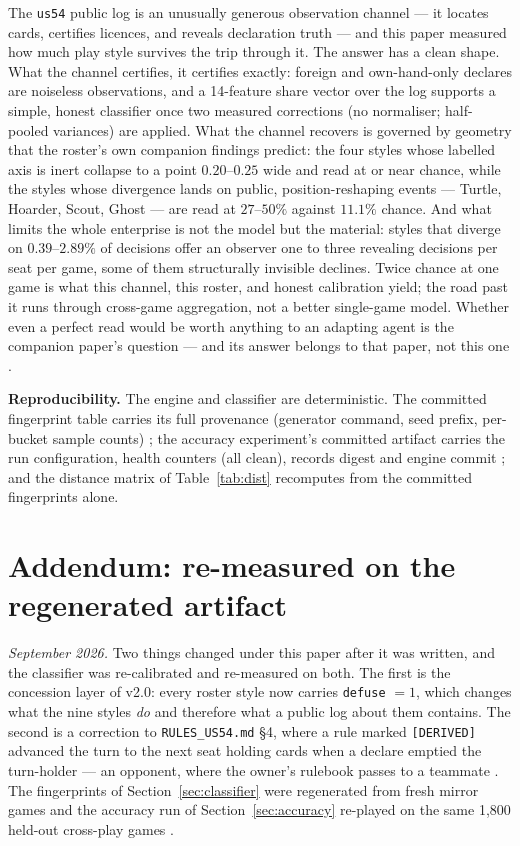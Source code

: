 \documentclass[11pt]{article}
\newcommand{\code}[1]{\texttt{#1}}
\newcommand{\usff}{\code{us54}}
\begin{document}
The \usff{} public log is an unusually generous observation channel --- it locates cards,
certifies licences, and reveals declaration truth --- and this paper measured how much play
style survives the trip through it. The answer has a clean shape. What the channel certifies,
it certifies exactly: foreign and own-hand-only declares are noiseless observations, and a
14-feature share vector over the log supports a simple, honest classifier once two measured
corrections (no normaliser; half-pooled variances) are applied. What the channel recovers is
governed by geometry that the roster's own companion findings predict: the four styles whose
labelled axis is inert collapse to a point $0.20$--$0.25$ wide and read at or near chance,
while the styles whose divergence lands on public, position-reshaping events --- Turtle,
Hoarder, Scout, Ghost --- are read at $27$--$50\%$ against $11.1\%$ chance. And what limits
the whole enterprise is not the model but the material: styles that diverge on
$0.39$--$2.89\%$ of decisions offer an observer one to three revealing decisions per seat per
game, some of them structurally invisible declines. Twice chance at one game is what this
channel, this roster, and honest calibration yield; the road past it runs through cross-game
aggregation, not a better single-game model. Whether even a perfect read would be worth
anything to an adapting agent is the companion paper's question --- and its answer belongs to
that paper, not this one \cite{v10}.

\medskip
\noindent\textbf{Reproducibility.} The engine and classifier are deterministic. The committed
fingerprint table carries its full provenance (generator command, seed prefix, per-bucket
sample counts) \cite{fingerprints}; the accuracy experiment's committed artifact carries the
run configuration, health counters (all clean), records digest and engine commit
\cite{artifact}; and the distance matrix of Table~\ref{tab:dist} recomputes from the
committed fingerprints alone.

\section{Addendum: re-measured on the regenerated artifact}
\label{sec:addregen}

\emph{September 2026.} Two things changed under this paper after it was written, and the
classifier was re-calibrated and re-measured on both. The first is the concession layer of
v2.0: every roster style now carries \code{defuse} $=1$, which changes what the nine styles
\emph{do} and therefore what a public log about them contains. The second is a correction to
\code{RULES\_US54.md} \S4, where a rule marked \code{[DERIVED]} advanced the turn to the next
seat holding cards when a declare emptied the turn-holder --- an opponent, where the owner's
rulebook passes to a teammate \cite{rules}. The fingerprints of Section~\ref{sec:classifier}
were regenerated from fresh mirror games and the accuracy run of Section~\ref{sec:accuracy}
re-played on the same 1{,}800 held-out cross-play games \cite{artifact}.
\end{document}
